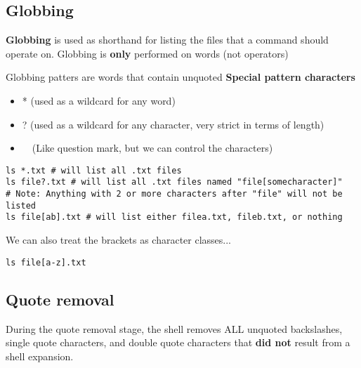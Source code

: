 \documentclass{report}
\begin{document}
  \pagebreak \bigbreak \noindent 
  \subsection{Globbing}
  \bigbreak \noindent 
  \begin{concept}
      \textbf{Globbing} is used as shorthand for listing the files that a command should operate on. Globbing is \textbf{only} performed on words (not operators)
  \end{concept}
  \bigbreak \noindent 
  Globbing patters are words that contain unquoted \textbf{Special pattern characters}
  \begin{itemize}
      \item * (used as a wildcard for any word)
        \item ? (used as a wildcard for any character, very strict in terms of length)
        \item \textlbrackdbl\ \  (Like question mark, but we can control the characters)
  \end{itemize}
  
  \begin{verbatim}
ls *.txt # will list all .txt files
ls file?.txt # will list all .txt files named "file[somecharacter]"
# Note: Anything with 2 or more characters after "file" will not be listed
ls file[ab].txt # will list either filea.txt, fileb.txt, or nothing
  \end{verbatim}
  \bigbreak \noindent
  
  \bigbreak \noindent 
  We can also treat the brackets as character classes...
  
  \begin{verbatim}
ls file[a-z].txt
  \end{verbatim}
  \bigbreak \noindent
  

  \bigbreak \noindent 
  \subsection{Quote removal}
  \bigbreak \noindent 
  During the quote removal stage, the shell removes ALL unquoted backslashes, single quote characters, and double quote characters that \textbf{did not} result from a shell expansion.
  \bigbreak \noindent 

  \bigbreak \noindent 
\end{document}
